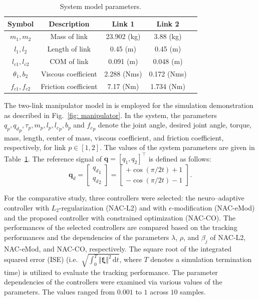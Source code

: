 \documentclass[letterpaper, 10 pt, conference]{ieeeconf}  %
\newcommand\ie{\textrm{i.e.\ }}
\newcommand*{\mv}[1]{\boldsymbol{#1}}
\newcommand\der{\mathrm d}
\begin{document}
\begin{table}[!t]
    \renewcommand{\arraystretch}{1.3}
    \caption{System model parameters.}
    \centering
    \begin{tabular}{|c||c|c|c|c|}
    \hline
    Symbol & \textbf{Description} & \textbf{Link 1} & \textbf{Link 2} \\
    \hline 
    $m_1, m_2$ & Mass of link    & 23.902 (kg) & 3.88 (kg) \\
    \hline
    $l_1, l_2$  & Length of link   & 0.45 (m) & 0.45 (m) \\
    \hline
    $l_{c1}, l_{c2}$ & COM of link  & 0.091 (m) & 0.048 (m) \\
    \hline
    $\theta_1, b_2$   & Viscous coefficient  &  2.288 (Nms) & 0.172 (Nms) \\
    \hline
    $f_{c1}, f_{c2}$  & Friction coefficient &  7.17 (Nm) & 1.734 (Nm) \\
    \hline
    \end{tabular}
    \label{table: system parameters}
\end{table}

The two-link manipulator model in \cite{RN33} is employed for the simulation demonstration as described in Fig.~\ref{fig: manipulator}.
In the system, the parameters $q_p,{q_d}_p,\tau_p,m_p,l_p,{l_c}_p,b_p$ and ${f_c}_p$ denote the joint angle, desired joint angle, torque, mass, length, center of mass, viscous coefficient, and friction coefficient, respectively, for link $p\in[1,2]$.
The values of the system parameters are given in Table~\ref{table: system parameters}.
The reference signal of $\mv q=[q_1,q_2]^\top $ is defined as follows:
\begin{equation}
    \mv q_d
    =
    \begin{bmatrix}
        {q_d}_1\\
        {q_d}_2
    \end{bmatrix}
    = 
    \begin{bmatrix}
        +\cos(\pi/2 t) + 1 \\
        -\cos(\pi/2 t) - 1 
    \end{bmatrix}
    .
\end{equation}

For the comparative study, three controllers were selected: the neuro–adaptive controller with $L_2$-regularization (NAC-L2) and with $\epsilon$-modification (NAC-eMod) and the proposed controller with constrained optimization (NAC-CO).
The performances of the selected controllers are compared based on the tracking performances and the dependencies of the parameters $\lambda$, $\rho$, and $\beta_j$ of NAC-L2, NAC-eMod, and NAC-CO, respectively.
The square root of the integrated squared error (ISE) (\ie $\sqrt{\int_0^T \Vert\mv \xi\Vert^2\,\der t}$, where $T$ denotes a simulation termination time) is utilized to evaluate the tracking performance.
The parameter dependencies of the controllers were examined via various values of the parameters. 
The values ranged from $0.001$ to $1$ across $10$ samples.
\end{document}
